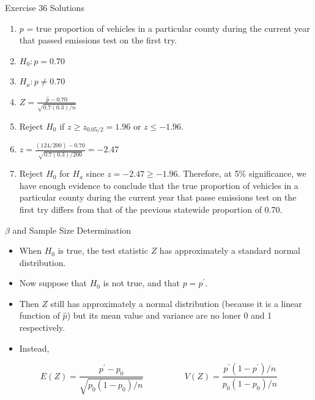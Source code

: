 \documentclass[
  ignorenonframetext,
]{beamer}
\providecommand{\tightlist}{%
  \setlength{\itemsep}{0pt}\setlength{\parskip}{0pt}}\usepackage{longtable,booktabs,array}
\begin{document}
\begin{frame}{Exercise 36 Solutions}
\protect\hypertarget{exercise-36-solutions}{}
\begin{enumerate}[<+->]
\tightlist
\item
  \(p\) = true proportion of vehicles in a particular county during the
  current year that passed emissions test on the first try.
\item
  \(H_{0}: p = 0.70\)
\item
  \(H_{a}: p \neq 0.70\)
\item
  \(Z = \frac{\hat{p} - 0.70}{\sqrt{0.7(0.3)/n}}\)
\item
  Reject \(H_{0}\) if \(z \geq z_{0.05/2} = 1.96\) or \(z \leq - 1.96\).
\item
  \(z = \frac{(124/200) - 0.70}{\sqrt{0.7(0.3)/200}} = -2.47\)
\item
  Reject \(H_{0}\) for \(H_{a}\) since \(z = -2.47 \geq -1.96\).
  Therefore, at 5\% significance, we have enough evidence to conclude
  that the true proportion of vehicles in a particular county during the
  current year that passe emissions test on the first try differs from
  that of the previous statewide proportion of 0.70.
\end{enumerate}
\end{frame}

\begin{frame}{\(\beta\) and Sample Size Determination}
\protect\hypertarget{beta-and-sample-size-determination-4}{}
\begin{itemize}[<+->]
\tightlist
\item
  When \(H_{0}\) is true, the test statistic \(Z\) has approximately a
  standard normal distribution.
\item
  Now suppose that \(H_{0}\) is not true, and that \(p = p^{\prime}\).
\item
  Then \(Z\) still has approximately a normal distribution (because it
  is a linear function of \(\hat{p}\)) but its mean value and variance
  are no loner 0 and 1 respectively.
\item
  Instead,
\end{itemize}

\[
E(Z) = \frac{p^{\prime} - p_{0}}{\sqrt{p_{0}(1-p_{0})/n}} \hspace{2cm} V(Z) = \frac{p^{\prime}(1-p^{\prime})/n}{p_{0}(1-p_{0})/n}
\]
\end{frame}
\end{document}
